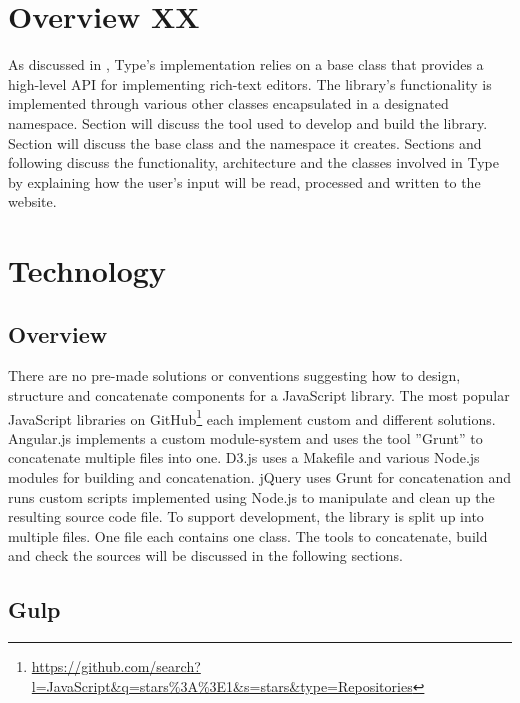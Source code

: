 

\section{Overview XX}

As discussed in , Type's implementation relies on a base class that provides a high-level API for implementing rich-text editors. The library's functionality is implemented through various other classes encapsulated in a designated namespace. Section  will discuss the tool used to develop and build the library. Section  will discuss the base class and the namespace it creates. Sections  and following discuss the functionality, architecture and the classes involved in Type by explaining how the user's input will be read, processed and written to the website.

\section{Technology}
\label{sec:impl_technology}

\subsection{Overview}

There are no pre-made solutions or conventions suggesting how to design, structure and concatenate components for a JavaScript library. The most popular JavaScript libraries on GitHub\footnote{\url{https://github.com/search?l=JavaScript\&q=stars\%3A\%3E1\&s=stars\&type=Repositories}} each implement custom and different solutions. Angular.js implements a custom module-system and uses the tool ''Grunt'' to concatenate multiple files into one. D3.js uses a Makefile and various Node.js modules for building and concatenation. jQuery uses Grunt for concatenation and runs custom scripts implemented using Node.js to manipulate and clean up the resulting source code file. To support development, the library is split up into multiple files. One file each contains one class. The tools to concatenate, build and check the sources will be discussed in the following sections.

\subsection{Gulp}

